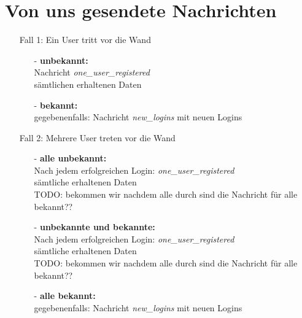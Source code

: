 \documentclass[10pt,a4paper]{article}
\begin{document}
\section{Von uns gesendete Nachrichten}
\begin{itemize}
\item[] Fall 1: Ein User tritt vor die Wand
	\begin{itemize}
	\item[-] \textbf{unbekannt:}\\
		Nachricht \textit{one\_user\_registered}\\
		sämtlichen erhaltenen Daten
	\item[-] \textbf{bekannt:}\\
		gegebenenfalls: Nachricht \textit{new\_logins} mit neuen Logins
	\end{itemize}
\item[] Fall 2: Mehrere User treten vor die Wand
	\begin{itemize}
	\item[-] \textbf{alle unbekannt:}\\
		Nach jedem erfolgreichen Login: \textit{one\_user\_registered}\\
		sämtliche erhaltenen Daten\\
		TODO: bekommen wir nachdem alle durch sind die Nachricht für alle bekannt??
	\item[-] \textbf{unbekannte und bekannte:}\\
		Nach jedem erfolgreichen Login: \textit{one\_user\_registered}\\
		sämtliche erhaltenen Daten\\
		TODO: bekommen wir nachdem alle durch sind die Nachricht für alle bekannt??
	\item[-] \textbf{alle bekannt:}\\
		gegebenenfalls: Nachricht \textit{new\_logins} mit neuen Logins
	\end{itemize}
\end{itemize}
\end{document}
